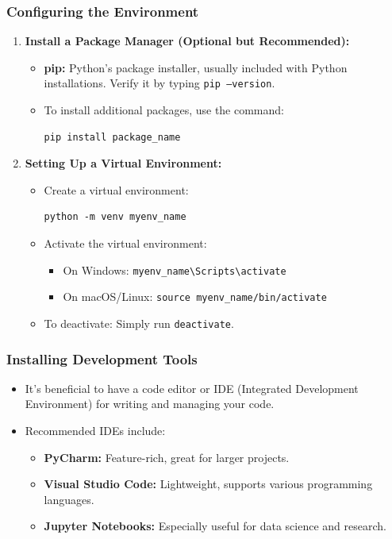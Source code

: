 \documentclass{beamer}
\begin{document}
\begin{frame}[fragile]
    \frametitle{Configuring the Environment}
    \begin{enumerate}
        \item \textbf{Install a Package Manager (Optional but Recommended):}
        \begin{itemize}
            \item \textbf{pip:} Python's package installer, usually included with Python installations. Verify it by typing \texttt{pip --version}. 
            \item To install additional packages, use the command: 
            \begin{lstlisting}
pip install package_name
            \end{lstlisting}
        \end{itemize}

        \item \textbf{Setting Up a Virtual Environment:}
        \begin{itemize}
            \item Create a virtual environment:
            \begin{lstlisting}
python -m venv myenv_name
            \end{lstlisting}
            \item Activate the virtual environment:
            \begin{itemize}
                \item On Windows: \texttt{myenv\_name\textbackslash Scripts\textbackslash activate}
                \item On macOS/Linux: \texttt{source myenv\_name/bin/activate}
            \end{itemize}
            \item To deactivate: Simply run \texttt{deactivate}.
        \end{itemize}
    \end{enumerate}
\end{frame}

\begin{frame}[fragile]
    \frametitle{Installing Development Tools}
    \begin{itemize}
        \item It's beneficial to have a code editor or IDE (Integrated Development Environment) for writing and managing your code.
        \item Recommended IDEs include:
        \begin{itemize}
            \item \textbf{PyCharm:} Feature-rich, great for larger projects.
            \item \textbf{Visual Studio Code:} Lightweight, supports various programming languages.
            \item \textbf{Jupyter Notebooks:} Especially useful for data science and research.
        \end{itemize}
    \end{itemize}
\end{frame}
\end{document}

